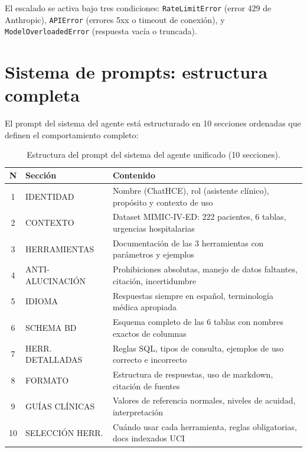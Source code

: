 El escalado se activa bajo tres condiciones: \texttt{RateLimitError} (error 429 de Anthropic), \texttt{APIError} (errores 5xx o timeout de conexión), y \texttt{ModelOverloadedError} (respuesta vacía o truncada).

\section{Sistema de prompts: estructura completa}
\label{sec:appendix_prompts}

El prompt del sistema del agente está estructurado en 10 secciones ordenadas que definen el comportamiento completo:

\begin{table}[H]
\centering
\caption{Estructura del prompt del sistema del agente unificado (10 secciones).}
\label{tab:appendix_prompt}
\footnotesize
\begin{tabularx}{\columnwidth}{clX}
\toprule
\textbf{N} & \textbf{Sección} & \textbf{Contenido} \\
\midrule
1 & IDENTIDAD & Nombre (ChatHCE), rol (asistente clínico), propósito y contexto de uso \\
2 & CONTEXTO & Dataset \acs{MIMIC}-IV-\acs{ED}: 222 pacientes, 6 tablas, urgencias hospitalarias \\
3 & HERRAMIENTAS & Documentación de las 3 herramientas con parámetros y ejemplos \\
4 & ANTI-ALUCINACIÓN & Prohibiciones absolutas, manejo de datos faltantes, citación, incertidumbre \\
5 & IDIOMA & Respuestas siempre en español, terminología médica apropiada \\
6 & SCHEMA BD & Esquema completo de las 6 tablas con nombres exactos de columnas \\
7 & HERR. DETALLADAS & Reglas \ac{SQL}, tipos de consulta, ejemplos de uso correcto e incorrecto \\
8 & FORMATO & Estructura de respuestas, uso de markdown, citación de fuentes \\
9 & GUÍAS CLÍNICAS & Valores de referencia normales, niveles de acuidad, interpretación \\
10 & SELECCIÓN HERR. & Cuándo usar cada herramienta, reglas obligatorias, docs indexados \ac{UCI} \\
\bottomrule
\end{tabularx}
\end{table}


